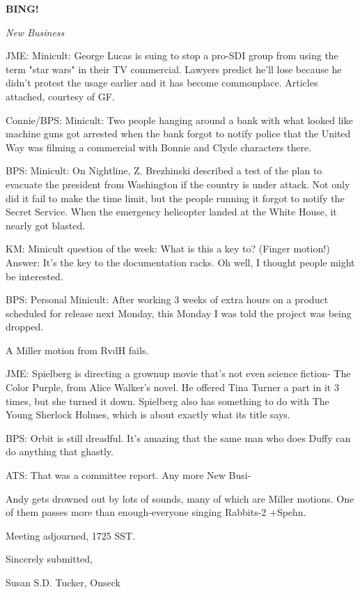 \documentclass[12pt]{article}
\newcommand{\bing}{{\bf BING!} }
\newcommand{\goto}[1]{\bing \vskip 12pt \centerline{{\em{#1}}}}
\begin{document}
\goto{New Business}

JME: Minicult: George Lucas is suing to stop a pro-SDI group from using the term "star wars" in their TV commercial. Lawyers predict he'll lose because he didn't protest the usage earlier and it has become commonplace. Articles attached, courtesy of GF.

Connie/BPS: Minicult: Two people hanging around a bank with what looked like machine guns got arrested when the bank forgot to notify police that the United Way was filming a commercial with Bonnie and Clyde characters there.

BPS: Minicult: On Nightline, Z. Brezhinski described a test of the plan to evacuate the president from Washington if the country is under attack. Not only did it fail to make the time limit, but the people running it forgot to notify the Secret Service. When the emergency helicopter landed at the White House, it nearly got blasted.

KM: Minicult question of the week: What is this a key to? (Finger motion!) Answer: It's the key to the documentation racks. Oh well, I thought people might be interested.

BPS: Personal Minicult: After working 3 weeks of extra hours on a product scheduled for release next Monday, this Monday I was told the project was being dropped.

A Miller motion from RvdH fails.

JME: Spielberg is directing a grownup movie that's not even science fiction- The Color Purple, from Alice Walker's novel. He offered Tina Turner a part in it 3 times, but she turned it down. Spielberg also has something to do with The Young Sherlock Holmes, which is about exactly what its title says.

BPS: Orbit is still dreadful. It's amazing that the same man who does Duffy can do anything that ghastly.

ATS: That was a committee report. Any more New Busi-

Andy gets drowned out by lots of sounds, many of which are Miller motions. One of them passes more than enough-everyone singing Rabbits-2 +Spehn.

\vspace{12pt}

\noindent
Meeting adjourned, 1725 SST.

\vspace{18pt}

\centerline{Sincerely submitted,}
\centerline{Susan S.D. Tucker, Onseck}
\end{document}
